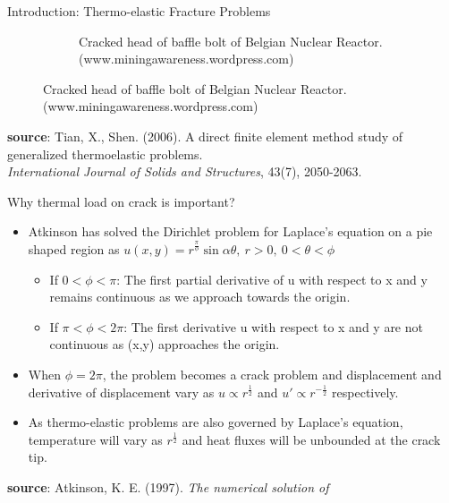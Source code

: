 \documentclass{beamer}
\begin{document}
\begin{frame}[t,fragile]{Introduction: Thermo-elastic Fracture Problems}
\begin{figure}[H]
\begin{subfigure}{0.45\textwidth}
 \caption{\tiny{Cracked head of baffle bolt of Belgian Nuclear Reactor.(www.miningawareness.wordpress.com)}}
 \label{fail}
 \end{subfigure}
 \end{figure}
 \vspace{-.3cm}
   \tiny
   \hspace{15pt}
   \textbf{source}: Tian, X., Shen. (2006). A direct finite element method study of generalized thermoelastic problems. \\
   \vspace{-7pt}
   \hspace{15pt}
   \emph{International Journal of Solids and Structures}, 43(7), 2050-2063.
\end{frame}
\begin{frame}[t,fragile]{Why thermal load on crack is important?}
    \vspace{-.3cm}
    \footnotesize
\begin{itemize}
    \item Atkinson has solved the Dirichlet problem for Laplace's equation on a pie shaped region as $u(x,y)= r^{\frac{\pi}{\phi}}\sin\alpha\theta,\  r>0,\ 0<\theta<\phi$
        \begin{itemize}
                \footnotesize
    \item If $0<\phi<\pi$:
        The first partial derivative of u with respect to x and y remains continuous as we approach towards the origin. 
    \item If $\pi<\phi<2\pi$:
        The first derivative u with respect to x and y are not continuous as (x,y) approaches the origin. 
    \end{itemize}
    \item When $\phi=2\pi$, the problem becomes a crack problem and displacement and derivative of displacement vary as $u \propto r^{\frac{1}{2}}$ and $u'\propto  r^{-\frac{1}{2}}$ respectively. 
    \item As thermo-elastic problems are also governed by Laplace's equation, temperature will vary as $r^{\frac{1}{2}}$ and heat fluxes will be unbounded at the crack tip. 
\end{itemize}
  \tiny
  \vspace{10pt}
  \hspace{10pt}
   \textbf{source}: Atkinson, K. E. (1997).
    \emph{The numerical solution of \\
  \hspace{10pt}
}
\end{frame}
\end{document}
